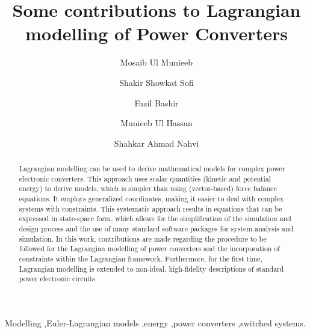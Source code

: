 \documentclass[preprint,12pt]{elsarticle}
\date{}
\begin{document}
\begin{frontmatter}

\title{Some contributions to Lagrangian modelling of Power Converters}

\author[1,2]{Mosaib Ul Munieeb}
\author[1,3]{Shakir Showkat Sofi } 
\author[1]{Fazil Bashir}
\author[1]{Munieeb Ul Hassan}
\author[1]{Shahkar Ahmad Nahvi} 
            



\begin{abstract}
Lagrangian modelling can be used to derive mathematical models for complex power electronic converters. This approach uses scalar quantities (kinetic and potential energy) to derive models, which is simpler than using (vector-based) force balance equations. It employs generalized coordinates, making it easier to deal with complex systems with constraints. This systematic approach results in equations that can be expressed in state-space form, which allows for the simplification of the simulation and design process and the use of many standard software packages for system analysis and simulation. In this work, contributions are made regarding the procedure to be followed for the Lagrangian modelling of power converters and the incorporation of constraints within the Lagrangian framework. Furthermore, for the first time, Lagrangian modelling is extended to non-ideal, high-fidelity descriptions of standard power electronic circuits.
\end{abstract}

\begin{keyword}
Modelling \sep Euler-Lagrangian models \sep energy \sep power converters \sep switched systems.
\end{keyword}

\end{frontmatter}
\end{document}

